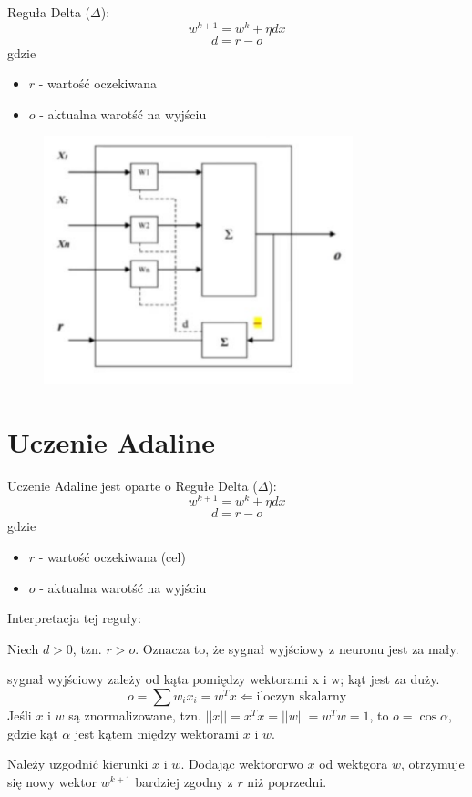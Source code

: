 \documentclass[a4paper,12pt]{article}
\begin{document}
Reguła Delta ($\Delta$):
\[
    w^{k + 1} = w^k + \eta dx
\]
\[
    d = r - o
\]
gdzie
\begin{itemize}
    \item $r$ - wartość oczekiwana
    \item $o$ - aktualna warotść na wyjściu
\end{itemize}
\begin{figure}[H]
    \centering
    \includegraphics[width=0.8\textwidth]{img/adaline.png}
    \label{fig:moj_obrazek}
\end{figure}
\newpage
\newpage
\section{Uczenie Adaline}
Uczenie Adaline jest oparte o Regułe Delta ($\Delta$):
\[
    w^{k + 1} = w^k + \eta dx
\]
\[
    d = r - o
\]
gdzie
\begin{itemize}
    \item $r$ - wartość oczekiwana (cel)
    \item $o$ - aktualna warotść na wyjściu
\end{itemize}

Interpretacja tej reguły:

Niech $d > 0$, tzn. $r > o$.
Oznacza to, że sygnał wyjściowy z neuronu jest za mały.


sygnał wyjściowy zależy od kąta pomiędzy wektorami x i w; kąt jest za duży.
\[
    o = \sum w_i x_i = w^T x \Leftarrow \text{iloczyn skalarny}
\]
Jeśli $x$ i $w$ są znormalizowane, tzn. $||x|| = x^T x = ||w||=w^T w = 1$, to 
$o = \cos \alpha$, gdzie kąt $\alpha$ jest kątem między wektorami $x$ i $w$.

Należy uzgodnić kierunki $x$ i $w$. Dodając wektororwo $x$ od wektgora $w$, otrzymuje się nowy wektor 
$w^{k + 1}$ bardziej zgodny z $r$ niż poprzedni.
\end{document}
